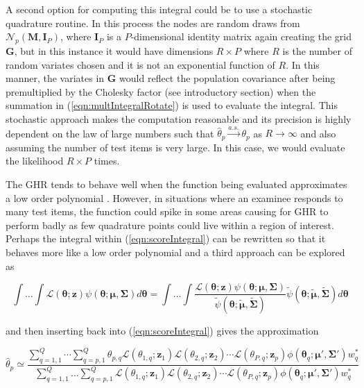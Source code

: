 \documentclass[12pt]{article}
\begin{document}
A second option for computing this integral could be to use a stochastic quadrature routine. In this process the nodes are random draws from $\mathcal{N}_p(\bm{M}, \bm{I}_P)$, where $\bm{I}_P$ is a $P$-dimensional identity matrix again creating the grid $\bm{G}$, but in this instance it would have dimensions $R \times P$ where $R$ is the number of random variates chosen and it is not an exponential function of $R$. In this manner, the variates in $\bm{G}$ would reflect the population covariance after being premultiplied by the Cholesky factor (see introductory section) when the summation in (\ref{eqn:multIntegralRotate}) is used to evaluate the integral. This stochastic approach makes the computation reasonable and its precision is highly dependent on the law of large numbers such that $\widehat{\theta}_p\xrightarrow{a.s.}\theta_p$ as $R\rightarrow\infty$ and also assuming the number of test items is very large. In this case, we would evaluate the likelihood $R \times P$ times.

The GHR tends to behave well when the function being evaluated approximates a low order polynomial \cite{liu:pierce}. However, in situations where an examinee responds to many test items, the function could spike in some areas causing for GHR to perform badly as few quadrature points could live within a region of interest. Perhaps the integral within (\ref{eqn:scoreIntegral}) can be rewritten so that it behaves more like a low order polynomial \cite{ets:2007,pin:bates,hesketh:skrondal,Tuerlinckx} and a third approach can be explored as

\begin{equation}
\int \dots \int \mathcal{L}(\boldsymbol{\theta};\boldsymbol{z})\psi(\boldsymbol{\theta};\boldsymbol{\mu},\boldsymbol{\Sigma})d\boldsymbol{\theta} = \int \dots \int \frac{\mathcal{L}(\boldsymbol{\theta};\boldsymbol{z})\psi(\boldsymbol{\theta};\boldsymbol{\mu},\boldsymbol{\Sigma})}{\widetilde{\psi}(\boldsymbol{\theta};\widetilde{\boldsymbol{\mu}},\widetilde{\boldsymbol{\Sigma}})}\widetilde{\psi}(\boldsymbol{\theta};\widetilde{\boldsymbol{\mu}},\widetilde{\boldsymbol{\Sigma}})d\boldsymbol{\theta}
\end{equation}

\noindent and then inserting back into (\ref{eqn:scoreIntegral}) gives the approximation

\begin{equation}
\label{eqn:intApprox}
\widehat{\theta}_p \simeq  \frac{\sum^Q_{q=1,1} \cdots \sum^Q_{q=p,1}\theta_{p,q} \mathcal{L}(\theta_{1,q};\bm{z}_1) \mathcal{L}(\theta_{2,q};\bm{z}_2)\cdots \mathcal{L}(\theta_{P,q};\bm{z}_p)\phi(\boldsymbol{\theta}_q;\boldsymbol{\mu}',\boldsymbol{\Sigma'})w^*_q}{\sum^Q_{q=1,1} \ldots\sum^Q_{q=p,1}\mathcal{L}(\theta_{1,q};\bm{z}_1) \mathcal{L}(\theta_{2,q};\bm{z}_2) \cdots \mathcal{L}(\theta_{P,q};\bm{z}_p)\phi(\boldsymbol{\theta}_q;\boldsymbol{\mu}',\boldsymbol{\Sigma'})w^*_q}
\end{equation}
\end{document}
